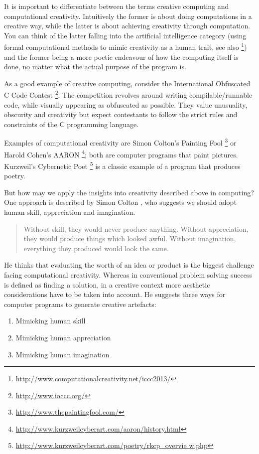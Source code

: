 It is important to differentiate between the terms creative computing and computational creativity. Intuitively the former is about doing computations in a creative way, while the latter is about achieving creativity through computation. You can think of the latter falling into the artificial intelligence category (using formal computational methods to mimic creativity as a human trait, see also \footnote{\url{http://www.computationalcreativity.net/iccc2013/}}) and the former being a more poetic endeavour of how the computing itself is done, no matter what the actual purpose of the program is.

As a good example of creative computing, consider the International Obfuscated C Code Contest \footnote{\url{http://www.ioccc.org/}}. The competition revolves around writing compilable/runnable code, while visually appearing as obfuscated as possible. They value unusuality, obscurity and creativity but expect contestants to follow the strict rules and constraints of the C programming language.

Examples of computational creativity are Simon Colton's Painting Fool \footnote{\url{http://www.thepaintingfool.com/}} or Harold Cohen's AARON \footnote{\url{http://www.kurzweilcyberart.com/aaron/history.html}}; both are computer programs that paint pictures. Kurzweil's Cybernetic Poet \footnote{\url{http://www.kurzweilcyberart.com/poetry/rkcp_overvie w.php}} is a classic example of a program that produces poetry.

But how may we apply the insights into creativity described above in computing? One approach is described by Simon Colton \citep{Colton2008}, who suggests we should adopt human skill, appreciation and imagination.

\begin{quote}
  Without skill, they would never produce anything. Without appreciation, they would produce things which looked awful. Without imagination, everything they produced would look the same. \citep{Colton2008}
\end{quote}

He thinks that evaluating the worth of an idea or product is the biggest challenge facing computational creativity. Whereas in conventional problem solving success is defined as finding a solution, in a creative context more aesthetic considerations have to be taken into account. He suggests three ways for computer programs to generate creative artefacts:

\begin{enumerate}
  \item Mimicking human skill
  \item Mimicking human appreciation
  \item Mimicking human imagination
\end{enumerate}

